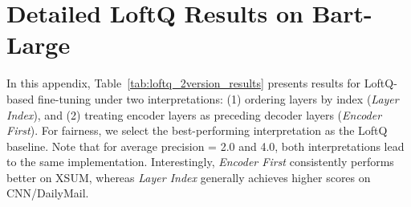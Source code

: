 \section{Detailed LoftQ Results on Bart-Large}\label{app:loftqbart}


In this appendix, Table~\ref{tab:loftq_2version_results} presents results for LoftQ-based fine-tuning under two interpretations: (1) ordering layers by index (\emph{Layer Index}), and (2) treating encoder layers as preceding decoder layers (\emph{Encoder First}). For fairness, we select the best-performing interpretation as the LoftQ baseline. Note that for average precision = 2.0 and 4.0, both interpretations lead to the same implementation. Interestingly, \emph{Encoder First} consistently performs better on XSUM, whereas \emph{Layer Index} generally achieves higher scores on CNN/DailyMail.

\begin{table}[ht]
    \centering
    \caption{ROUGE-1/ROUGE-2/ROUGE-L results of Bart-Large fine-tuned with LoftQ. Columns labeled 2.0, 2.25, 2.5, 3.0, and 4.0 refer to the average bits per parameter (bpp) or average precision. Higher scores indicate better performance.}
    \label{tab:loftq_2version_results}
\end{table}
